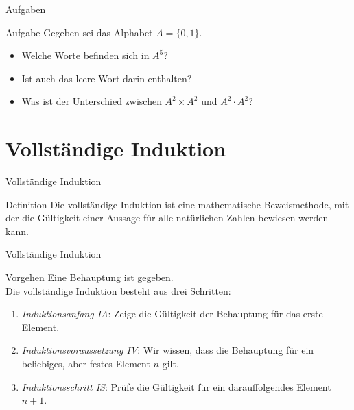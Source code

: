 \documentclass[18pt]{beamer}
\begin{document}
\begin{frame}{Aufgaben}
    \begin{exampleblock}{Aufgabe}
        Gegeben sei das Alphabet $A = \{ 0, 1\}$.
        \begin{itemize}
            \item Welche Worte befinden sich in $A^5$?
                \pause
            \item Ist auch das leere Wort darin enthalten?
                \pause
            \item Was ist der Unterschied zwischen $A^2 \times A^2$ und $A^2 \cdot A^2$?
        \end{itemize}
    \end{exampleblock}
\end{frame}

\section{Vollständige Induktion}
\begin{frame}{Vollständige Induktion}
    \begin{block}{Definition}
        Die vollständige Induktion ist eine mathematische Beweismethode, mit der die Gültigkeit einer Aussage für alle natürlichen Zahlen bewiesen werden kann.
    \end{block}
\end{frame}
\begin{frame}{Vollständige Induktion}
    \begin{block}{Vorgehen}
        Eine Behauptung ist gegeben.\\\pause
        Die vollständige Induktion besteht aus drei Schritten:
        \begin{enumerate}
            \item \emph{Induktionsanfang IA}: Zeige die Gültigkeit der Behauptung für das erste Element.
                \pause
            \item \emph{Induktionsvoraussetzung IV}: Wir wissen, dass die Behauptung für ein beliebiges, aber festes Element $n$ gilt.
                \pause
            \item \emph{Induktionsschritt IS}: Prüfe die Gültigkeit für ein darauffolgendes Element $n+1$.
        \end{enumerate}
    \end{block}
\end{frame}
\end{document}
